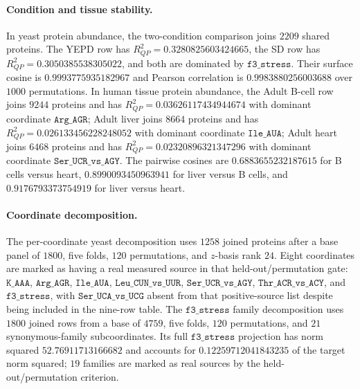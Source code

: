\paragraph{Condition and tissue stability.}
In yeast protein abundance, the two-condition comparison joins $2209$ shared proteins.  The YEPD row has $R^2_{QP}=0.3280825603424665$, the SD row has $R^2_{QP}=0.3050385538305022$, and both are dominated by $\texttt{f3\_stress}$.  Their surface cosine is $0.9993775935182967$ and Pearson correlation is $0.9983880256003688$ over $1000$ permutations.  In human tissue protein abundance, the Adult B-cell row joins $9244$ proteins and has $R^2_{QP}=0.03626117434944674$ with dominant coordinate $\texttt{Arg\_AGR}$; Adult liver joins $8664$ proteins and has $R^2_{QP}=0.026133456228248052$ with dominant coordinate $\texttt{Ile\_AUA}$; Adult heart joins $6468$ proteins and has $R^2_{QP}=0.02320896321347296$ with dominant coordinate $\texttt{Ser\_UCR\_vs\_AGY}$.  The pairwise cosines are $0.6883655232187615$ for B cells versus heart, $0.8990093450963941$ for liver versus B cells, and $0.9176793373754919$ for liver versus heart.

\paragraph{Coordinate decomposition.}
The per-coordinate yeast decomposition uses $1258$ joined proteins after a base panel of $1800$, five folds, $120$ permutations, and $z$-basis rank $24$.  Eight coordinates are marked as having a real measured source in that held-out/permutation gate: $\texttt{K\_AAA}$, $\texttt{Arg\_AGR}$, $\texttt{Ile\_AUA}$, $\texttt{Leu\_CUN\_vs\_UUR}$, $\texttt{Ser\_UCR\_vs\_AGY}$, $\texttt{Thr\_ACR\_vs\_ACY}$, and $\texttt{f3\_stress}$, with $\texttt{Ser\_UCA\_vs\_UCG}$ absent from that positive-source list despite being included in the nine-row table.  The $\texttt{f3\_stress}$ family decomposition uses $1800$ joined rows from a base of $4759$, five folds, $120$ permutations, and $21$ synonymous-family subcoordinates.  Its full $\texttt{f3\_stress}$ projection has norm squared $52.76911713166682$ and accounts for $0.12259712041843235$ of the target norm squared; $19$ families are marked as real sources by the held-out/permutation criterion.

